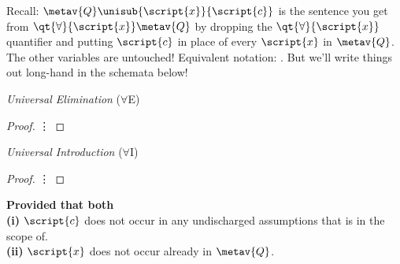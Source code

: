 Recall: $\metav{Q}\unisub{\script{x}}{\script{c}}$ is the sentence you get from $\qt{\forall}{\script{x}}\metav{Q}$ by dropping the $\qt{\forall}{\script{x}}$ quantifier and putting $\script{c}$ in place of every $\script{x}$ in $\metav{Q}$. The other variables are untouched! Equivalent notation: \hspace{.15em}. But we'll write things out long-hand in the schemata below! 




\begin{multicols}{2}

\textit{Universal Elimination} ($\forall$E) 

\begin{proof}
	 {\hspace{2em} \vdots}
	 
\end{proof}


\vspace{2.5em}

\textit{Universal Introduction} ($\forall$I) 

\begin{proof}
	 {\hspace{2em} \vdots}
	 
\end{proof}

\textbf{Provided that both} \\
\textbf{(i)} $\script{c}$ does not occur in any undischarged assumptions that  is in the scope of. \\
\textbf{(ii)} $\script{x}$ does not occur already in $\metav{Q}$.




\end{multicols}
